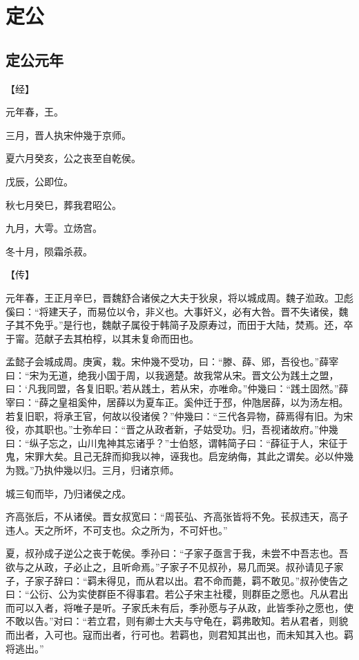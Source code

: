 \documentclass[a4paper,12pt,UTF8,twoside]{ctexbook}
\begin{document}
\part{定公}

\chapter{定公元年}



【经】

元年春，王。

三月，晋人执宋仲幾于京师。

夏六月癸亥，公之丧至自乾侯。

戊辰，公即位。

秋七月癸巳，葬我君昭公。

九月，大雩。立炀宫。

冬十月，陨霜杀菽。

【传】

元年春，王正月辛巳，晋魏舒合诸侯之大夫于狄泉，将以城成周。魏子涖政。卫彪傒曰：“将建天子，而易位以令，非义也。大事奸义，必有大咎。晋不失诸侯，魏子其不免乎。”是行也，魏献子属役于韩简子及原寿过，而田于大陆，焚焉。还，卒于甯。范献子去其柏椁，以其未复命而田也。

孟懿子会城成周。庚寅，栽。宋仲幾不受功，曰：“滕、薛、郳，吾役也。”薛宰曰：“宋为无道，绝我小国于周，以我適楚。故我常从宋。晋文公为践土之盟，曰：‘凡我同盟，各复旧职。’若从践土，若从宋，亦唯命。”仲幾曰：“践土固然。”薛宰曰：“薛之皇祖奚仲，居薛以为夏车正。奚仲迁于邳，仲虺居薛，以为汤左相。若复旧职，将承王官，何故以役诸侯？”仲幾曰：“三代各异物，薛焉得有旧。为宋役，亦其职也。”士弥牟曰：“晋之从政者新，子姑受功。归，吾视诸故府。”仲幾曰：“纵子忘之，山川鬼神其忘诸乎？”士伯怒，谓韩简子曰：“薛征于人，宋征于鬼，宋罪大矣。且己无辞而抑我以神，诬我也。启宠纳侮，其此之谓矣。必以仲幾为戮。”乃执仲幾以归。三月，归诸京师。

城三旬而毕，乃归诸侯之戍。

齐高张后，不从诸侯。晋女叔宽曰：“周苌弘、齐高张皆将不免。苌叔违天，高子违人。天之所坏，不可支也。众之所为，不可奸也。”

夏，叔孙成子逆公之丧于乾侯。季孙曰：“子家子亟言于我，未尝不中吾志也。吾欲与之从政，子必止之，且听命焉。”子家子不见叔孙，易几而哭。叔孙请见子家子，子家子辞曰：“羁未得见，而从君以出。君不命而薨，羁不敢见。”叔孙使告之曰：“公衍、公为实使群臣不得事君。若公子宋主社稷，则群臣之愿也。凡从君出而可以入者，将唯子是听。子家氏未有后，季孙愿与子从政，此皆季孙之愿也，使不敢以告。”对曰：“若立君，则有卿士大夫与守龟在，羁弗敢知。若从君者，则貌而出者，入可也。寇而出者，行可也。若羁也，则君知其出也，而未知其入也。羁将逃出。”
\end{document}
